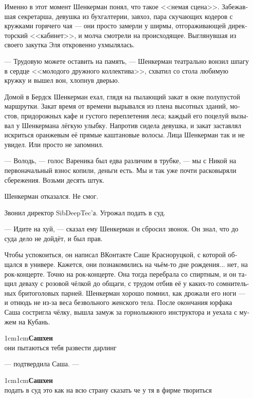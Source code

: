 \documentclass[a5paper,12pt,fleqn]{extbook}\usepackage{cooltooltips}\usepackage{polyglossia}\setdefaultlanguage[babelshorthands=true]{russian}\setotherlanguage{english}\defaultfontfeatures{Ligatures=TeX,Mapping=tex-text} \usepackage{xcolor}\definecolor{lightgray}{HTML}{bbbbbb}\color{lightgray}\newcommand{\ml}[3]{\textenglish{\textcolor{black}{#3}}}
\newcommand{\asterism}{\vspace{1em}{\centering\Large\bfseries$\ast~\ast~\ast$\par}\vspace{1em}}
\newcommand{\VKmessage}[1]{\begin{adjustwidth}{1cm}{1cm}{\vkfont \footnotesize \textcolor{VKLink}{\textbf{Сашхен}}\\#1}\end{adjustwidth}\hspace{0.1em}}
\begin{document}
Именно в этот момент Шенкерман понял, что такое <<немая сцена>>.
Забежавшая секретарша, девушка из бухгалтерии, завхоз, пара скучающих кодеров с кружками горячего чая --- они просто замерли у ширмы, отгораживающей директорский <<кабинет>>, и молча смотрели на происходящее.
Выглянувшая из своего закутка Эля откровенно ухмылялась.

--- Трудовую можете оставить на память, --- Шенкерман театрально вонзил шпагу в сердце <<молодого дружного коллектива>>, схватил со стола любимую кружку и вышел вон, хлопнув дверью.

\asterism

Домой в Бердск Шенкерман ехал, глядя на пылающий закат в окне полупустой маршрутки.
Закат время от времени вырывался из плена высотных зданий, мостов, придорожных кафе и густого переплетения леса;
каждый его поцелуй вызывал у Шенкермана лёгкую улыбку.
Напротив сидела девушка, и закат заставлял искриться оранжевым её прямые каштановые волосы.
Лица Шенкерман так и не увидел.
Или просто не запомнил.

--- Володь, --- голос Вареника был едва различим в трубке, --- мы с Никой на первоначальный взнос копили, деньги есть.
Мы и так уже почти расковыряли сбережения.
Возьми десять штук.

Шенкерман отказался.
Не смог.

Звонил директор SibDeepTec'а.
Угрожал подать в суд.

--- Идите на хуй, --- сказал ему Шенкерман и сбросил звонок.
Он знал, что до суда дело не дойдёт, и был прав.

Чтобы успокоиться, он написал ВКонтакте Саше Красноруцкой, с которой общался в универе.
Кажется, они познакомились на чьём-то дне рождения... нет, на рок-концерте.
Точно на рок-концерте.
Она тогда перебрала со спиртным, и он тащил деваху с розовой чёлкой до общаги, с трудом отбив её у каких-то сомнительных бритоголовых парней.
Шенкерман хорошо помнил, как дрожали его ноги --- и отнюдь не из-за веса безвольного женского тела.
После окончания юрфака Саша состригла чёлку, вышла замуж за горнолыжного инструктора и уехала с мужем на Кубань.

\hspace{0.2em}

\VKmessage{они пытаються тебя развести дарлинг}

--- подтвердила Саша. ---

\hspace{0.2em}

\VKmessage{подать в суд это как на всю страну сказать че у тя в фирме твориться}
\end{document}
